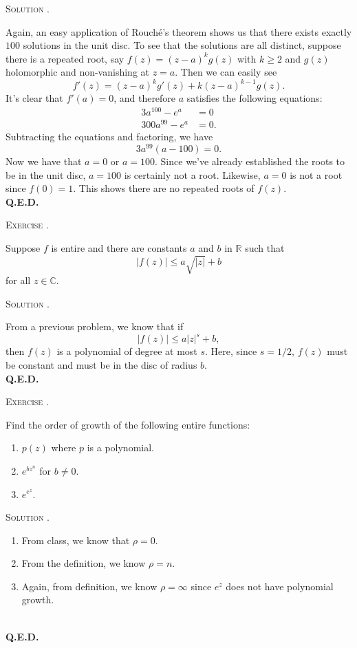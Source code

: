 \documentclass[12pt]{article}
\newcounter{problem}
\renewcommand{\qed}{\hfill\textsc{\textbf{Q.E.D.}}}
\newcommand{\R}{\ensuremath{\mathbb{R}}}
\newcommand{\C}{\ensuremath{\mathbb{C}}}
\newenvironment{problem}[1][\stepcounter{problem}\theproblem]{\bigskip\noindent\textsc{Exercise #1.}\smallskip\par\begin{itshape}}{\end{itshape}}
\newenvironment{solution}[1][\hspace{-1ex}.]{\medskip\noindent\textsc{Solution #1}\smallskip\par}{\hspace*{\fill}\\ \hspace*{0pt}\qed \clearpage}
\begin{document}
\begin{solution}
    Again, an easy application of Rouch\'{e}'s theorem shows us that there exists exactly $100$ solutions in the unit disc. To see that the solutions are all distinct, suppose there is a repeated root, say $f(z)=(z-a)^kg(z)$ with $k\geq2$ and $g(z)$ holomorphic and non-vanishing at $z=a$. Then we can easily see
    \[
        f'(z)=(z-a)^kg'(z)+k(z-a)^{k-1}g(z).
    \]
    It's clear that $f'(a)=0$, and therefore $a$ satisfies the following equations:
    \begin{align*}
        3a^{100}-e^a&=0\\
        300a^{99}-e^a&=0.
    \end{align*}
    Subtracting the equations and factoring, we have
    \[
        3a^{99}(a-100)=0.
    \]
    Now we have that $a=0$ or $a=100$. Since we've already established the roots to be in the unit disc, $a=100$ is certainly not a root. Likewise, $a=0$ is not a root since $f(0)=1$. This shows there are no repeated roots of $f(z)$.
\end{solution}

\begin{problem}
    Suppose $f$ is entire and there are constants $a$ and $b$ in $\R$ such that
    \[
        |f(z)|\leq a\sqrt{|z|}+b
    \]
    for all $z\in\C$.
\end{problem}

\begin{solution}
    From a previous problem, we know that if 
    \[
        |f(z)|\leq a|z|^s+b,
    \]
    then $f(z)$ is a polynomial of degree at most $s$. Here, since $s=1/2$, $f(z)$ must be constant and must be in the disc of radius $b$.
\end{solution}

\begin{problem}
    Find the order of growth of the following entire functions:
    \begin{enumerate}
        \item $p(z)$ where $p$ is a polynomial.
        
        \item $e^{bz^n}$ for $b\neq0$.
        
        \item $e^{e^z}$.
    \end{enumerate}
\end{problem}

\begin{solution}\hfill
    \begin{enumerate}
        \item From class, we know that $\rho=0$.
        
        \item From the definition, we know $\rho=n$.
        
        \item Again, from definition, we know $\rho=\infty$ since $e^z$ does not have polynomial growth.
    \end{enumerate}
\end{solution}
\end{document}
